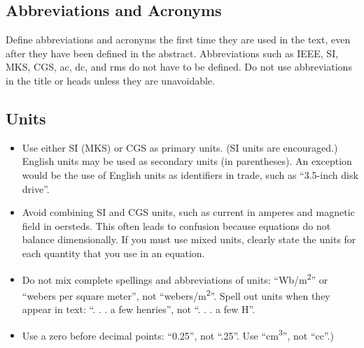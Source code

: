 \documentclass[conference]{IEEEtran}
\begin{document}
\subsection{Abbreviations and Acronyms}\label{AA}
Define abbreviations and acronyms the first time they are used in the text, 
even after they have been defined in the abstract. Abbreviations such as 
IEEE, SI, MKS, CGS, ac, dc, and rms do not have to be defined. Do not use 
abbreviations in the title or heads unless they are unavoidable.

\subsection{Units}
\begin{itemize}
\item Use either SI (MKS) or CGS as primary units. (SI units are encouraged.) English units may be used as secondary units (in parentheses). An exception would be the use of English units as identifiers in trade, such as ``3.5-inch disk drive''.
\item Avoid combining SI and CGS units, such as current in amperes and magnetic field in oersteds. This often leads to confusion because equations do not balance dimensionally. If you must use mixed units, clearly state the units for each quantity that you use in an equation.
\item Do not mix complete spellings and abbreviations of units: ``Wb/m\textsuperscript{2}'' or ``webers per square meter'', not ``webers/m\textsuperscript{2}''. Spell out units when they appear in text: ``. . . a few henries'', not ``. . . a few H''.
\item Use a zero before decimal points: ``0.25'', not ``.25''. Use ``cm\textsuperscript{3}'', not ``cc''.)
\end{itemize}
\end{document}
